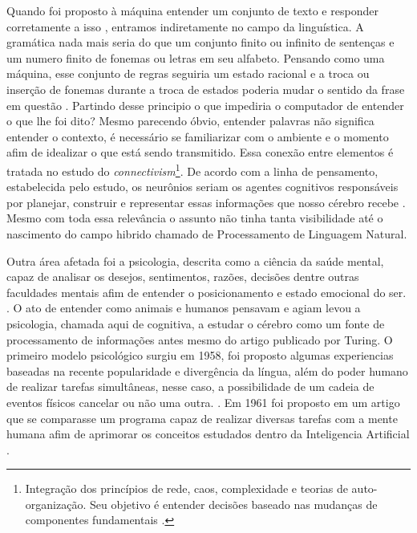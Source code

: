 Quando foi proposto à máquina entender um conjunto de texto e responder corretamente a isso \cite[146]{turing1950}, entramos indiretamente no campo da linguística. A gramática nada mais seria do que um conjunto finito ou infinito de sentenças e um numero finito de fonemas ou letras em seu alfabeto. Pensando como uma máquina, esse conjunto de regras seguiria um estado racional e a troca ou inserção de fonemas durante a troca de estados poderia mudar o sentido da frase em questão \cite[13-16]{chomsky2002syntactic}. Partindo desse principio o que impediria o computador de entender o que lhe foi dito? Mesmo parecendo óbvio, entender palavras não significa entender o contexto, é necessário se familiarizar com o ambiente e o momento afim de idealizar o que está sendo transmitido. Essa conexão entre elementos é tratada no estudo do \textit{connectivism}\footnote{Integração dos princípios de rede, caos, complexidade e teorias de auto-organização. Seu objetivo é entender decisões baseado nas mudanças de componentes fundamentais \cite[5]{siemens2014connectivism}.}. De acordo com a linha de pensamento, estabelecida pelo estudo, os neurônios seriam os agentes cognitivos responsáveis por planejar, construir e representar essas informações que nosso cérebro recebe \cite[22]{brandura1996}. Mesmo com toda essa relevância o assunto não tinha tanta visibilidade até o nascimento  do campo hibrido chamado de Processamento de Linguagem Natural. \cite[16]{russell2003artificial}

Outra área afetada foi a psicologia, descrita como a ciência da saúde mental, capaz de analisar os desejos, sentimentos, razões, decisões dentre outras faculdades mentais afim de entender o posicionamento e estado emocional do ser. \cite[4-6]{william1890principles}. O ato de entender como animais e humanos pensavam e agiam levou a psicologia, chamada aqui de cognitiva, a estudar o cérebro como um fonte de processamento de informações antes mesmo do artigo publicado por Turing. O primeiro modelo psicológico surgiu em 1958, foi proposto algumas experiencias baseadas na recente popularidade e divergência da língua, além do poder humano de realizar tarefas simultâneas, nesse caso, a possibilidade de um cadeia de eventos físicos cancelar ou não uma outra. \cite[4-7]{broadbent1958perception}. Em 1961 foi proposto em um artigo que se comparasse um programa capaz de realizar diversas tarefas com a mente humana afim de aprimorar os conceitos estudados dentro da Inteligencia Artificial \cite[110]{newell1961gps}.

